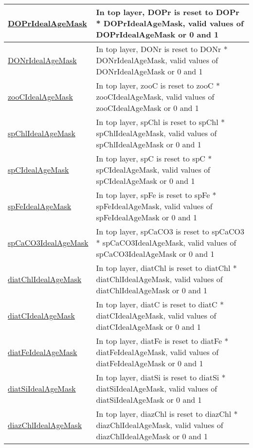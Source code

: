 {\begin{center}
\begin{longtable}{| p{2.0in} | p{4.0in} |}
    \hline
    \hyperref[subsec:var_sec_forcing_DOPrIdealAgeMask]{DOPrIdealAgeMask} & In top layer, DOPr is reset to DOPr * DOPrIdealAgeMask, valid values of DOPrIdealAgeMask or 0 and 1 \\
    \hline
    \hyperref[subsec:var_sec_forcing_DONrIdealAgeMask]{DONrIdealAgeMask} & In top layer, DONr is reset to DONr * DONrIdealAgeMask, valid values of DONrIdealAgeMask or 0 and 1 \\
    \hline
    \hyperref[subsec:var_sec_forcing_zooCIdealAgeMask]{zooCIdealAgeMask} & In top layer, zooC is reset to zooC * zooCIdealAgeMask, valid values of zooCIdealAgeMask or 0 and 1 \\
    \hline
    \hyperref[subsec:var_sec_forcing_spChlIdealAgeMask]{spChlIdealAgeMask} & In top layer, spChl is reset to spChl * spChlIdealAgeMask, valid values of spChlIdealAgeMask or 0 and 1 \\
    \hline
    \hyperref[subsec:var_sec_forcing_spCIdealAgeMask]{spCIdealAgeMask} & In top layer, spC is reset to spC * spCIdealAgeMask, valid values of spCIdealAgeMask or 0 and 1 \\
    \hline
    \hyperref[subsec:var_sec_forcing_spFeIdealAgeMask]{spFeIdealAgeMask} & In top layer, spFe is reset to spFe * spFeIdealAgeMask, valid values of spFeIdealAgeMask or 0 and 1 \\
    \hline
    \hyperref[subsec:var_sec_forcing_spCaCO3IdealAgeMask]{spCaCO3IdealAgeMask} & In top layer, spCaCO3 is reset to spCaCO3 * spCaCO3IdealAgeMask, valid values of spCaCO3IdealAgeMask or 0 and 1 \\
    \hline
    \hyperref[subsec:var_sec_forcing_diatChlIdealAgeMask]{diatChlIdealAgeMask} & In top layer, diatChl is reset to diatChl * diatChlIdealAgeMask, valid values of diatChlIdealAgeMask or 0 and 1 \\
    \hline
    \hyperref[subsec:var_sec_forcing_diatCIdealAgeMask]{diatCIdealAgeMask} & In top layer, diatC is reset to diatC * diatCIdealAgeMask, valid values of diatCIdealAgeMask or 0 and 1 \\
    \hline
    \hyperref[subsec:var_sec_forcing_diatFeIdealAgeMask]{diatFeIdealAgeMask} & In top layer, diatFe is reset to diatFe * diatFeIdealAgeMask, valid values of diatFeIdealAgeMask or 0 and 1 \\
    \hline
    \hyperref[subsec:var_sec_forcing_diatSiIdealAgeMask]{diatSiIdealAgeMask} & In top layer, diatSi is reset to diatSi * diatSiIdealAgeMask, valid values of diatSiIdealAgeMask or 0 and 1 \\
    \hline
    \hyperref[subsec:var_sec_forcing_diazChlIdealAgeMask]{diazChlIdealAgeMask} & In top layer, diazChl is reset to diazChl * diazChlIdealAgeMask, valid values of diazChlIdealAgeMask or 0 and 1 \\

\end{longtable}
\end{center}}
